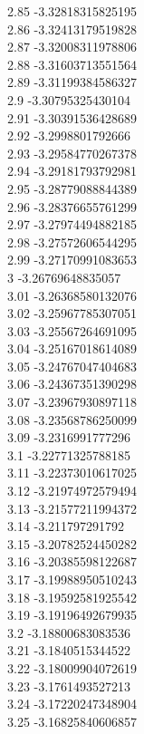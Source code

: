 {2.85	-3.32818315825195\\
2.86	-3.32413179519828\\
2.87	-3.32008311978806\\
2.88	-3.31603713551564\\
2.89	-3.31199384586327\\
2.9	-3.30795325430104\\
2.91	-3.30391536428689\\
2.92	-3.2998801792666\\
2.93	-3.29584770267378\\
2.94	-3.29181793792981\\
2.95	-3.28779088844389\\
2.96	-3.28376655761299\\
2.97	-3.27974494882185\\
2.98	-3.27572606544295\\
2.99	-3.27170991083653\\
3	-3.26769648835057\\
3.01	-3.26368580132076\\
3.02	-3.25967785307051\\
3.03	-3.25567264691095\\
3.04	-3.25167018614089\\
3.05	-3.24767047404683\\
3.06	-3.24367351390298\\
3.07	-3.23967930897118\\
3.08	-3.23568786250099\\
3.09	-3.2316991777296\\
3.1	-3.22771325788185\\
3.11	-3.22373010617025\\
3.12	-3.21974972579494\\
3.13	-3.21577211994372\\
3.14	-3.211797291792\\
3.15	-3.20782524450282\\
3.16	-3.20385598122687\\
3.17	-3.19988950510243\\
3.18	-3.19592581925542\\
3.19	-3.19196492679935\\
3.2	-3.18800683083536\\
3.21	-3.1840515344522\\
3.22	-3.18009904072619\\
3.23	-3.1761493527213\\
3.24	-3.17220247348904\\
3.25	-3.16825840606857\\
}
